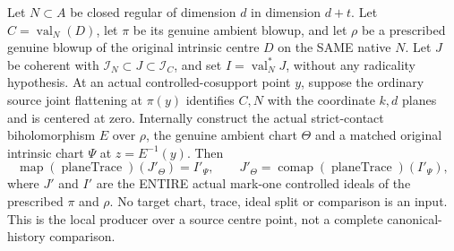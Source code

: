 \begin{theorem}
\label{hir:disjoint-actual-whole-controlled-split}
\leanok
Let $N\subset A$ be closed regular of dimension $d$ in dimension $d+t$.
Let $C=\operatorname{val}_N(D)$, let $\pi$ be its genuine ambient blowup, and
let $\rho$ be a prescribed genuine blowup of the original intrinsic centre
$D$ on the SAME native $N$. Let $J$ be coherent with
$\mathcal I_N\subset J\subset\mathcal I_C$, and set
$I=\operatorname{val}_N^*J$, without any radicality hypothesis.
At an actual controlled-cosupport point $y$, suppose the ordinary source
joint flattening at $\pi(y)$ identifies $C,N$ with the coordinate $k,d$ planes
and is centered at zero. Internally construct the actual strict-contact
biholomorphism $E$ over $\rho$, the genuine ambient chart $\Theta$ and a
matched original intrinsic chart $\Psi$ at $z=E^{-1}(y)$. Then
\[
 \operatorname{map}(\operatorname{planeTrace})(J'_\Theta)=I'_\Psi,
 \qquad
 J'_\Theta=\operatorname{comap}(\operatorname{planeTrace})(I'_\Psi),
\]
where $J'$ and $I'$ are the ENTIRE actual mark-one controlled ideals of the
prescribed $\pi$ and $\rho$. No target chart, trace, ideal split or comparison
is an input. This is the local producer over a source centre point, not a
complete canonical-history comparison.
\end{theorem}
